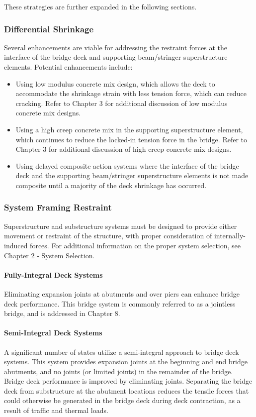 These strategies are further expanded in the following sections.

\subsubsection{Differential Shrinkage}
Several enhancements are viable for addressing the restraint forces at the interface of the bridge deck and
supporting beam/stringer superstructure elements. Potential enhancements include:
\begin{itemize}
  \item Using low modulus concrete mix design, which allows the deck to accommodate the shrinkage strain with
  less tension force, which can reduce cracking. Refer to Chapter 3 for additional discussion of low modulus
  concrete mix designs.
  \item Using a high creep concrete mix in the supporting superstructure element, which continues to reduce the
  locked-in tension force in the bridge. Refer to Chapter 3 for additional discussion of high creep concrete mix
  designs.
  \item Using delayed composite action systems where the interface of the bridge deck and the supporting
  beam/stringer superstructure elements is not made composite until a majority of the deck shrinkage has
  occurred.
\end{itemize}

\subsubsection{System Framing Restraint}
Superstructure and substructure systems must be designed to provide either movement or restraint of the
structure, with proper consideration of internally-induced forces. For additional information on the proper system
selection, see Chapter 2 - System Selection.

\paragraph{Fully-Integral Deck Systems}
Eliminating expansion joints at abutments and over piers can enhance bridge deck performance. This bridge
system is commonly referred to as a jointless bridge, and is addressed in Chapter 8.

\paragraph{Semi-Integral Deck Systems}
A significant number of states utilize a semi-integral approach to bridge deck systems. This system provides
expansion joints at the beginning and end bridge abutments, and no joints (or limited joints) in the remainder of the
bridge. Bridge deck performance is improved by eliminating joints. Separating the bridge deck from substructure at
the abutment locations reduces the tensile forces that could otherwise be generated in the bridge deck during deck
contraction, as a result of traffic and thermal loads.


